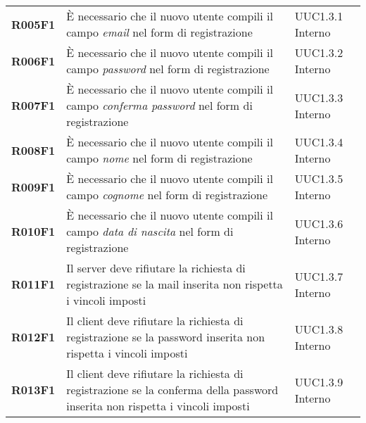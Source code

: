 \documentclass[../analisi-dei-requisiti.tex]{subfiles}
\begin{document}
\begin{longtable}[H]{>{\centering\bfseries}m{3cm} >{\centering}m{10cm} >{\centering\arraybackslash}m{3cm}}
  R005F1                               & È necessario che il nuovo utente compili il campo \textit{email} nel form di registrazione                                                                                                              & UUC1.3.1 Interno              \\
  R006F1                               & È necessario che il nuovo utente compili il campo \textit{password} nel form di registrazione                                                                                                           & UUC1.3.2 Interno              \\
  R007F1                               & È necessario che il nuovo utente compili il campo \textit{conferma password} nel form di registrazione                                                                                                  & UUC1.3.3 Interno              \\
  R008F1                               & È necessario che il nuovo utente compili il campo \textit{nome} nel form di registrazione                                                                                                               & UUC1.3.4 Interno              \\
  R009F1                               & È necessario che il nuovo utente compili il campo \textit{cognome} nel form di registrazione                                                                                                            & UUC1.3.5 Interno              \\
  R010F1                               & È necessario che il nuovo utente compili il campo \textit{data di nascita} nel form di registrazione                                                                                                    & UUC1.3.6 Interno              \\
  R011F1                               & Il server deve rifiutare la richiesta di registrazione se la mail inserita non rispetta i vincoli imposti                                                                                               & UUC1.3.7 Interno              \\
  R012F1                               & Il client deve rifiutare la richiesta di registrazione se la password inserita non rispetta i vincoli imposti                                                                                           & UUC1.3.8 Interno              \\
  R013F1                               & Il client deve rifiutare la richiesta di registrazione se la conferma della password inserita non rispetta i vincoli imposti                                                                            & UUC1.3.9 Interno              \\

\end{longtable}
\end{document}
